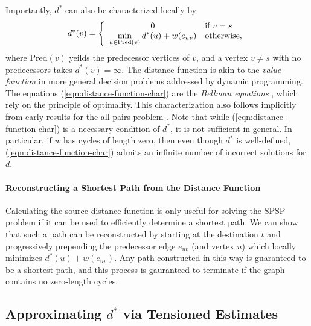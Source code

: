 Importantly, $d^*$ can also be characterized locally by
\begin{equation}
   d^*(v) = 
   \left\{ \begin{array}{cl}
      0 & \mbox{if } v = s \\
      \displaystyle\min_{u \in \mbox{\scriptsize Pred}(v)} d^*(u) + w(e_{uv}) & \mbox{otherwise,} \\
   \end{array} \right.
   \label{eqn:distance-function-char}
\end{equation}
where $\mbox{Pred}(v)$ yeilds the predecessor vertices of $v$,
and a vertex $v \neq s$ with no predecessors takes $d^*(v) = \infty$.
The distance function is akin to the \emph{value function}
in more general decision problems addressed by dynamic programming.
The equations (\ref{eqn:distance-function-char})
are the \emph{Bellman equations} \citep{bellman1958routing},
which rely on the principle of optimality.
This characterization also follows implicitly from early results for
the all-pairs problem
\citep{shimbel1955communicationnets, beckmann1955transportation}.
Note that while (\ref{eqn:distance-function-char})
is a necessary condition of $d^*$,
it is not sufficient in general.
In particular,
if $w$ has cycles of length zero,
then even though $d^*$ is well-defined,
(\ref{eqn:distance-function-char}) admits an infinite number
of incorrect solutions for $d$.

\paragraph{Reconstructing a Shortest Path from the Distance Function}
Calculating the source distance function is only useful for solving
the SPSP problem if it can be used to efficiently determine
a shortest path.
We can show that such a path can be reconstructed by starting at
the destination $t$ and progressively prepending the predecessor
edge $e_{uv}$ (and vertex $u$)
which locally minimizes $d^*(u) + w(e_{uv})$.
Any path constructed in this way is guaranteed to be a shortest path,
and this process is gauranteed to terminate if the graph
contains no zero-length cycles.

\subsection{Approximating $d^*$ via Tensioned Estimates}
\label{subsec:ibid-tension}

